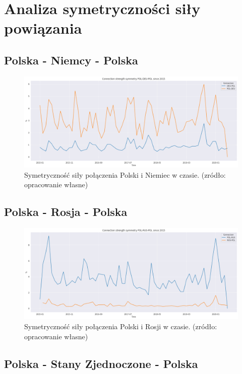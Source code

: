 \documentclass[11pt]{report}
\begin{document}
 \section{Analiza symetryczności siły powiązania}
 \subsection{Polska - Niemcy - Polska}
  
    \begin{figure}[ht]
	\centering
	\includegraphics[width=0.8 \textwidth]{fig/ConnectionSymmetry/POL-DEU-POL.png}
	\caption{Symetryczność siły połączenia Polski i Niemiec w czasie. (zródło: opracowanie własne)}
	\label{fig:POL-DEU-POL}
	\end{figure}
	
 \subsection{Polska - Rosja - Polska}
  
    \begin{figure}[ht]
	\centering
	\includegraphics[width=0.8 \textwidth]{fig/ConnectionSymmetry/POL-RUS-POL.png}
	\caption{Symetryczność siły połączenia Polski i Rosji w czasie. (zródło: opracowanie własne)}
	\label{fig:POL-RUS-POL}
	\end{figure}
	
 \subsection{Polska - Stany Zjednoczone - Polska}
  
\end{document}

